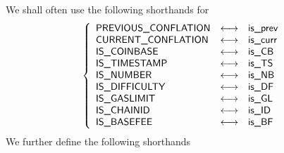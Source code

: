 We shall often use the following shorthands for
\[
	\left\{ \begin{array}{lcl}
		\textsf{PREVIOUS\_CONFLATION} & \longleftrightarrow & \textsf{is\_prev}   \\
		\textsf{CURRENT\_CONFLATION}  & \longleftrightarrow & \textsf{is\_curr}   \\
		\textsf{IS\_COINBASE}         & \longleftrightarrow & \textsf{is\_CB}   \\
		\textsf{IS\_TIMESTAMP}        & \longleftrightarrow & \textsf{is\_TS}  \\
		\textsf{IS\_NUMBER}           & \longleftrightarrow & \textsf{is\_NB}     \\
		\textsf{IS\_DIFFICULTY}       & \longleftrightarrow & \textsf{is\_DF} \\
		\textsf{IS\_GASLIMIT}         & \longleftrightarrow & \textsf{is\_GL}   \\
		\textsf{IS\_CHAINID}          & \longleftrightarrow & \textsf{is\_ID}    \\
		\textsf{IS\_BASEFEE}          & \longleftrightarrow & \textsf{is\_BF}    \\
	\end{array} \right.
\]
\noindent We further define the following shorthands
